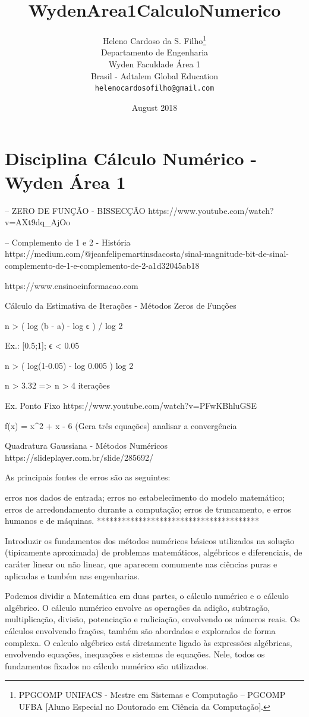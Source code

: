 \documentclass{article}
\title{WydenArea1CalculoNumerico}
\author{
  Heleno Cardoso da S. Filho\thanks{PPGCOMP UNIFACS - Mestre em Sistemas e Computação -- PGCOMP UFBA [Aluno Especial no Doutorado em Ciência da Computação].} \\
  Departamento de Engenharia\\
  Wyden Faculdade Área 1\\
  Brasil - Adtalem Global Education\\
  \texttt{helenocardosofilho@gmail.com} \\
}
\date{August 2018}
\begin{document}
\maketitle

\section{Disciplina Cálculo Numérico - Wyden Área 1}
-- ZERO DE FUNÇÃO - BISSECÇÃO
https://www.youtube.com/watch?v=AXt9dq_AjOo

-- Complemento de 1 e 2 - História
https://medium.com/@jeanfelipemartinsdacosta/sinal-magnitude-bit-de-sinal-complemento-de-1-e-complemento-de-2-a1d32045ab18

https://www.ensinoeinformacao.com

Cálculo da Estimativa de Iterações - Métodos Zeros de Funções

n > ( log (b - a) - log ϵ ) / log 2

Ex.: [0.5;1]; ϵ < 0.05

n > ( log(1-0.05) - log 0.005 ) log 2

n > 3.32 => n > 4 iterações

Ex. Ponto Fixo
https://www.youtube.com/watch?v=PFwKBhluGSE

f(x) = x^2 + x - 6 (Gera três equações) analisar a convergência



Quadratura Gaussiana - Métodos Numéricos
https://slideplayer.com.br/slide/285692/

As principais fontes de erros são as seguintes:

erros nos dados de entrada;
erros no estabelecimento do modelo matemático;
erros de arredondamento durante a computação;
erros de truncamento, e
erros humanos e de máquinas.
***************************************


Introduzir os fundamentos dos métodos numéricos básicos utilizados na solução (tipicamente aproximada) de problemas matemáticos, algébricos e diferenciais, de caráter linear ou não linear, que aparecem comumente nas ciências puras e aplicadas e também nas engenharias.

Podemos dividir a Matemática em duas partes, o cálculo numérico e o cálculo algébrico. O cálculo numérico envolve as operações da adição, subtração, multiplicação, divisão, potenciação e radiciação, envolvendo os números reais. Os cálculos envolvendo frações, também são abordados e explorados de forma complexa. 
O calculo algébrico está diretamente ligado às expressões algébricas, envolvendo equações, inequações e sistemas de equações. Nele, todos os fundamentos fixados no cálculo numérico são utilizados. 
\end{document}
